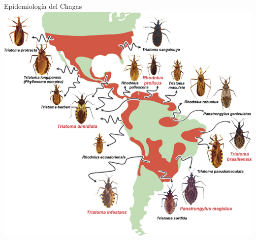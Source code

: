 \documentclass[xcolor=x11names]{beamer}
\begin{document}

\begin{frame}{Epidemiología del Chagas}
			\includegraphics[height=.9\textheight]{slides/triatomine-map.jpg}
\end{frame}
\end{document}
